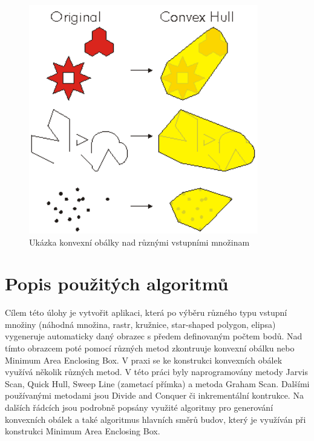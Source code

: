 \documentclass[a4paper,11pt,twoside]{article}
\begin{document}
\vspace{0.2cm}
\begin{figure}[hbt!] 
\begin{center}
\includegraphics[width=10cm]{pictures/convex2.png} 
\caption[Ukázka konvexní obálky nad různými vstupními množinami]{Ukázka konvexní obálky nad různými vstupními množinam \cite{convex2}}
\label{fig:convex2}
\end{center}
\end{figure}
\vspace{-0.4cm}


\newpage
\vspace*{-1cm}
\section{Popis použitých algoritmů}
\noindent
\large
Cílem této úlohy je vytvořit aplikaci, která po výběru různého typu vstupní množiny (náhodná množina, rastr, kružnice, star-shaped polygon, elipsa)  vygeneruje automaticky daný obrazec s předem definovaným počtem bodů. Nad tímto obrazcem poté pomocí různých metod zkontruuje konvexní obálku nebo Minimum Area Enclosing Box. V praxi se ke konstrukci konvexních obálek využívá několik různých metod. V této práci byly naprogramovány metody Jarvis Scan, Quick Hull, Sweep Line (zametací přímka) a metoda Graham Scan. Dalšími používanými metodami jsou Divide and Conquer či inkrementální kontrukce. Na dalších řádcích jsou podrobně popsány využité algoritmy pro generování konvexních obálek a také algoritmus hlavních směrů budov, který je využíván při konstrukci Minimum Area Enclosing Box.
\end{document}
